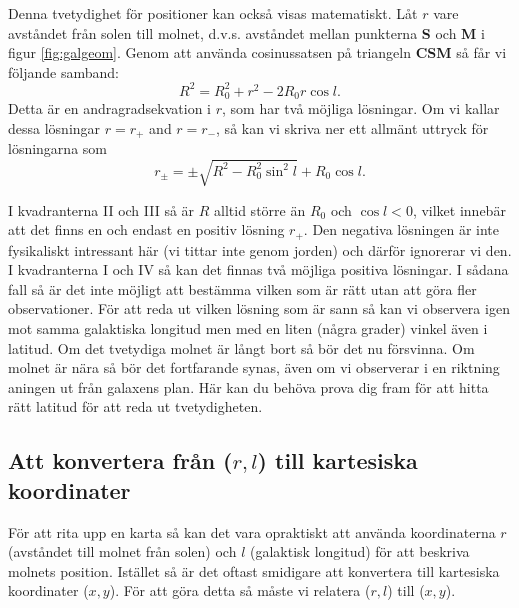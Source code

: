 Denna tvetydighet för positioner kan också visas matematiskt. Låt $r$ vare 
avståndet från solen till molnet, d.v.s. avståndet mellan punkterna {\bf
S} och {\bf M} i  figur \ref{fig:galgeom}. Genom att använda cosinussatsen
på triangeln {\bf CSM} så får vi följande samband:
\begin{equation}
R^2 = R_0^2 + r^2 - 2 R_0 r \cos l.
\end{equation}
Detta är en andragradsekvation i $r$, som har två möjliga lösningar. Om vi
kallar dessa lösningar $r=r_{+}$ and $r=r_{-}$, så kan vi skriva ner ett 
allmänt uttryck för lösningarna som 
\begin{equation}
\boxed{
r_\pm = \pm \sqrt{R^2 - R_0^2 \sin^2 l} + R_0\cos l .
}
\label{eqn:rpm}
\end{equation}

I kvadranterna II och III så är $R$ alltid större än $R_0$ och $\cos l <0$,
vilket innebär att det finns en och endast en positiv lösning $r_+$. Den 
negativa lösningen är inte fysikaliskt intressant här (vi tittar inte genom jorden) 
och därför ignorerar vi den. 
I kvadranterna I och IV så kan det finnas två möjliga positiva lösningar.
I sådana fall så är det inte möjligt att bestämma vilken som är rätt utan att göra
fler observationer. För att reda ut vilken lösning som är sann så kan vi observera
igen mot samma galaktiska longitud men med en liten (några grader) vinkel
även i latitud. Om det tvetydiga molnet är långt bort så bör det nu försvinna. Om
molnet är nära så bör det fortfarande synas, även om vi observerar i en riktning
aningen ut från galaxens plan. Här kan du behöva prova dig fram för att hitta 
rätt latitud för att reda ut tvetydigheten. 

\subsection{Att konvertera från ($r,l$) till kartesiska koordinater} 
För att rita upp en karta så kan det vara opraktiskt att använda koordinaterna
$r$ (avståndet till molnet från solen) och $l$ (galaktisk longitud) för att beskriva
molnets position. Istället så är det oftast smidigare att konvertera till kartesiska koordinater
($x,y$). För att göra detta så måste vi relatera ($r, l$) till ($x, y$). 

